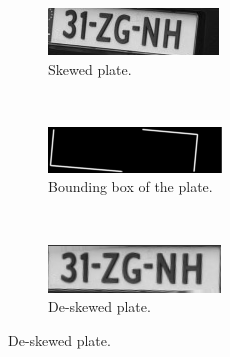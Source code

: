 \begin{figure}[ht]
        \centering
        \begin{subfigure}{0.33\textwidth}
            \includegraphics[width=\textwidth]{plaatjes/skewed-plate}
            \caption{Skewed plate.}
            \label{fig:skewed-plate}
        \end{subfigure}%
        ~ 
        \begin{subfigure}{0.33\textwidth}
            \includegraphics[width=\textwidth]{plaatjes/skewed-plate-box}
            \caption{Bounding box of the plate.}
            \label{fig:skewed-bounding-box}
        \end{subfigure}%
        ~ 
        \begin{subfigure}{0.33\textwidth}
            \includegraphics[width=\textwidth]{plaatjes/rotated-plate}
            \caption{De-skewed plate.}
            \label{fig:rotated-plate}
        \end{subfigure}%


\end{figure}
